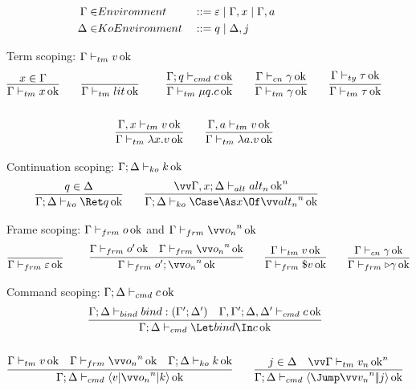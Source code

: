 \documentclass{article}
\begin{document}
\begin{figure}
\centering
\begin{gather*}
\begin{aligned}
  \Gamma \in& Environment
  &
  &::= \varepsilon
  \mid \Gamma, x
  \mid \Gamma, a
  \\
  \Delta \in& KoEnvironment
  &
  &::= q
  \mid \Delta, j
\end{aligned}
\end{gather*}

Term scoping: $\Gamma \vdash_{tm} v \operatorname{ok}$
\begin{gather*}
  \infer
  {\scopetm{\Gamma}{x}}
  {x \in \Gamma}
  \qquad
  \axiom{\scopetm{\Gamma}{\lit}}
  \qquad
  \infer
  {\scopetm{\Gamma}{\compute q \cmd}}
  {\scopecmd{\Gamma}{q}{\cmd}}
  \qquad
  \infer
  {\scopetm{\Gamma}{\cn}}
  {\scopecn{\Gamma}{\cn}}
  \qquad
  \infer
  {\scopetm{\Gamma}{\ty}}
  {\scopety{\Gamma}{\ty}}
  \\\\
  \infer
  {\scopetm{\Gamma}{\fn x \tm}}
  {\scopetm{\Gamma, x}{\tm}}
  \qquad
  \infer
  {\scopetm{\Gamma}{\fn a \tm}}
  {\scopetm{\Gamma, a}{\tm}}
\end{gather*}

Continuation scoping: $\Gamma; \Delta \vdash_{ko} k \operatorname{ok}$
\begin{gather*}
  \infer
  {\scopeko{\Gamma}{\Delta}{\ret q}}
  {q \in \Delta}
  \qquad
  \infer
  {\scopeko{\Gamma}{\Delta}{\caseas{x}{\vect[n]{\analt_n}}}}
  {
    \vect[n]{
      \scopealt{\Gamma, x}{\Delta}{\analt_n}
    }
  }
\end{gather*}

Frame scoping: $\Gamma \vdash_{frm} o \operatorname{ok}$ and
$\scopefrm{\Gamma}{\vect[n]{\frm_n}}$
\begin{gather*}
  \axiom{\scopefrm{\Gamma}{\mt}}
  \qquad
  \infer
  {\scopefrm{\Gamma}{\frm' \then \vect[n]{\frm_n}}}
  {
    \scopefrm{\Gamma}{\frm'}
    &
    \scopefrm{\Gamma}{\vect[n]{\frm_n}}
  }
  \qquad
  \infer
  {\scopefrm{\Gamma}{\appto{\tm}}}
  {\scopetm{\Gamma}{\tm}}
  \qquad
  \infer
  {\scopefrm{\Gamma}{\castby{\cn}}}
  {\scopecn{\Gamma}{\cn}}
\end{gather*}

Command scoping: $\Gamma; \Delta \vdash_{cmd} c \operatorname{ok}$
\begin{gather*}
  \infer
  {\scopecmd{\Gamma}{\Delta}{\Let \abind \In \cmd}}
  {
    \scopebind{\Gamma}{\Delta}{\abind}{\Gamma'}{\Delta'}
    &
    \scopecmd{\Gamma,\Gamma'}{\Delta,\Delta'}{\cmd}
  }
  \\\\
  \infer
  {\scopecmd{\Gamma}{\Delta}{\braket{\tm | \vect[n]{\frm_n} | \ko}}}
  {
    \scopetm{\Gamma}{\tm}
    &
    \scopefrm{\Gamma}{\vect[n]{\frm_n}}
    &
    \scopeko{\Gamma}{\Delta}{\ko}
  }
  \qquad
  \infer
  {\scopecmd{\Gamma}{\Delta}{\jump{\vect[n]{\tm_n}}{j}}}
  {
    j \in \Delta
    &
    \vect[n]{
      \scopetm{\Gamma}{\tm_n}
    }
  }
\end{gather*}



\end{figure}
\end{document}
